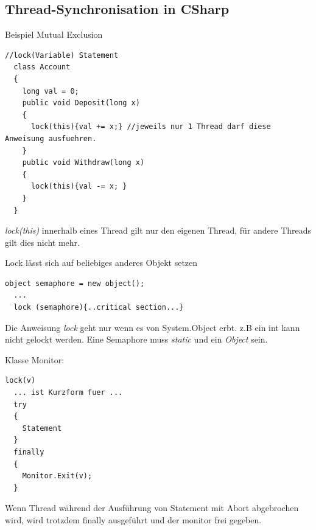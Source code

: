  \subsection{Thread-Synchronisation in CSharp } 
Beispiel Mutual Exclusion 
\begin{multicols}{2}
\begin{lstlisting}[style=C]
  //lock(Variable) Statement
  class Account
  {
    long val = 0; 
    public void Deposit(long x)
    {
      lock(this){val += x;} //jeweils nur 1 Thread darf diese Anweisung ausfuehren.
    }
    public void Withdraw(long x)
    {
      lock(this){val -= x; }
    }
  }
\end{lstlisting} 

\columnbreak

\textit{lock(this)} innerhalb eines Thread gilt nur den eigenen Thread, für andere Threads gilt dies nicht mehr.

\end{multicols}

Lock lässt sich auf beliebiges anderes Objekt setzen
\begin{multicols}{2}

\begin{lstlisting}[style=C]
  object semaphore = new object(); 
  ...
  lock (semaphore){..critical section...}
\end{lstlisting} 
\columnbreak

Die Anweisung \textit{lock} geht nur wenn es von System.Object erbt. z.B ein int kann nicht gelockt werden.
Eine Semaphore muss \textit{static} und ein \textit{Object} sein.

\end{multicols}

Klasse Monitor:\\
\begin{lstlisting}[style=C]
  lock(v) 
  ... ist Kurzform fuer ...
  try
  {
    Statement
  }
  finally
  {
    Monitor.Exit(v); 
  }
\end{lstlisting} 
Wenn Thread während der Ausführung von Statement mit Abort abgebrochen wird,
wird trotzdem finally ausgeführt und der monitor frei gegeben.\\

